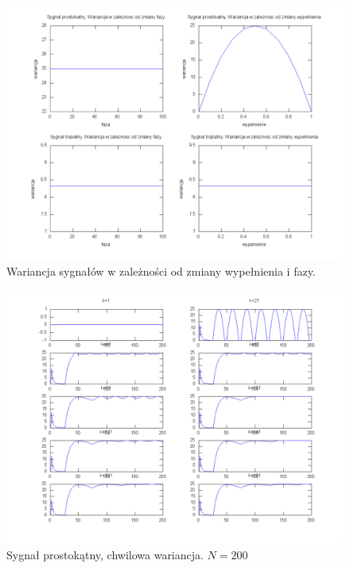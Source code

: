 \documentclass[wide,a4paper,titlepage,12pt]{mwart}
\begin{document}
      \begin{landscape}
        \begin{figure}[htbp]
          \begin{center}
            \includegraphics[scale=.5]{out/Figure7.png}
            \caption{\label{wykres7}Wariancja sygnałów w zależności od zmiany wypełnienia i fazy.}
          \end{center}
        \end{figure}
      \end{landscape}


      \begin{landscape}
        \begin{figure}[htbp]
          \begin{center}
            \includegraphics[scale=.5]{out/Figure8.png}
            \caption{\label{wykres8}Sygnał prostokątny, chwilowa wariancja. $N=200$}
          \end{center}
        \end{figure}
      \end{landscape}
\end{document}
